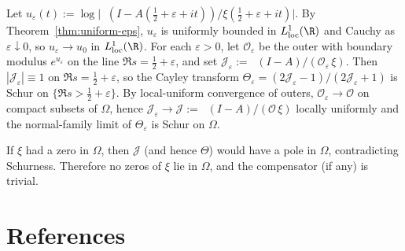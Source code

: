 \documentclass[11pt]{article}
\theoremstyle{remark}
\DeclareMathOperator{\dettwo}{det_2}
\begin{document}
Let $u_\varepsilon(t):=\log\big|\dettwo(I-A(\tfrac12+\varepsilon+it))/\xi(\tfrac12+\varepsilon+it)\big|$. By Theorem~\ref{thm:uniform-eps}, $u_\varepsilon$ is uniformly bounded in $L^1_{\mathrm{loc}}(\R)$ and Cauchy as $\varepsilon\downarrow 0$, so $u_\varepsilon\to u_0$ in $L^1_{\mathrm{loc}}(\R)$. For each $\varepsilon>0$, let $\mathcal O_\varepsilon$ be the outer with boundary modulus $e^{u_\varepsilon}$ on the line $\Re s=\tfrac12+\varepsilon$, and set $\mathcal J_\varepsilon:=\dettwo(I\!-\!A)/(\mathcal O_\varepsilon\,\xi)$. Then $|\mathcal J_\varepsilon|\equiv 1$ on $\Re s=\tfrac12+\varepsilon$, so the Cayley transform $\Theta_\varepsilon=(2\mathcal J_\varepsilon-1)/(2\mathcal J_\varepsilon+1)$ is Schur on $\{\Re s>\tfrac12+\varepsilon\}$. By local-uniform convergence of outers, $\mathcal O_\varepsilon\to \mathcal O$ on compact subsets of $\Omega$, hence $\mathcal J_\varepsilon\to \mathcal J:=\dettwo(I\!-\!A)/(\mathcal O\,\xi)$ locally uniformly and the normal-family limit of $\Theta_\varepsilon$ is Schur on $\Omega$.

If $\xi$ had a zero in $\Omega$, then $\mathcal J$ (and hence $\Theta$) would have a pole in $\Omega$, contradicting Schurness. Therefore no zeros of $\xi$ lie in $\Omega$, and the compensator (if any) is trivial.

\section*{References}
\begingroup
\small


\endgroup
\end{document}
